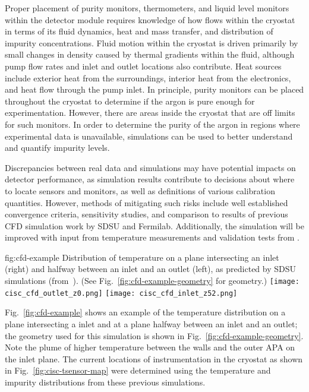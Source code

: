 Proper placement of purity monitors, thermometers, and liquid level monitors within the detector module requires knowledge of how  flows within the cryostat in terms of its fluid dynamics, heat and mass transfer, and distribution of impurity concentrations. Fluid motion within the cryostat is driven primarily by small changes in density caused by thermal gradients within the fluid, although pump flow rates and inlet and outlet locations also contribute. Heat sources include exterior heat from the surroundings, interior heat from the electronics, and heat flow through the pump inlet. In principle, purity monitors can be placed throughout the cryostat to determine if the argon is pure enough for experimentation. However, there are areas inside the cryostat that are off limits for such monitors. In order to determine the purity of the argon in regions where experimental data is unavailable,  simulations can be used to better understand and quantify impurity levels.

Discrepancies between real data and simulations may have potential impacts on detector performance, as simulation results contribute to decisions about where to locate sensors and monitors, as well as definitions of various calibration quantities. However, methods of mitigating such risks include well established convergence criteria, sensitivity studies, and comparison to results of previous CFD simulation work by SDSU and Fermilab. Additionally, the simulation will be improved with input from temperature measurements and validation tests from .

\begin{dunefigure}{fig:cfd-example}
  {Distribution of temperature on a plane intersecting an inlet (right) and halfway between an inlet and an outlet (left), as predicted by SDSU  simulations (from~\cite{docdb-5915}). (See Fig.~\ref{fig:cfd-example-geometry} for geometry.)}
  \texttt{[image: cisc\_cfd\_outlet\_z0.png]}
  \texttt{[image: cisc\_cfd\_inlet\_z52.png]}
\end{dunefigure}

Fig.~\ref{fig:cfd-example} shows an example of the temperature
distribution on a plane intersecting a  inlet and at a
plane halfway between an inlet and an outlet; 
the geometry used for
this simulation is shown in Fig.~\ref{fig:cfd-example-geometry}. Note the plume of higher temperature  between the walls and
the outer APA on the inlet plane. The current locations of instrumentation in
the cryostat as shown in Fig.~\ref{fig:cisc-tsensor-map} were determined using the temperature and impurity distributions from these previous simulations.

